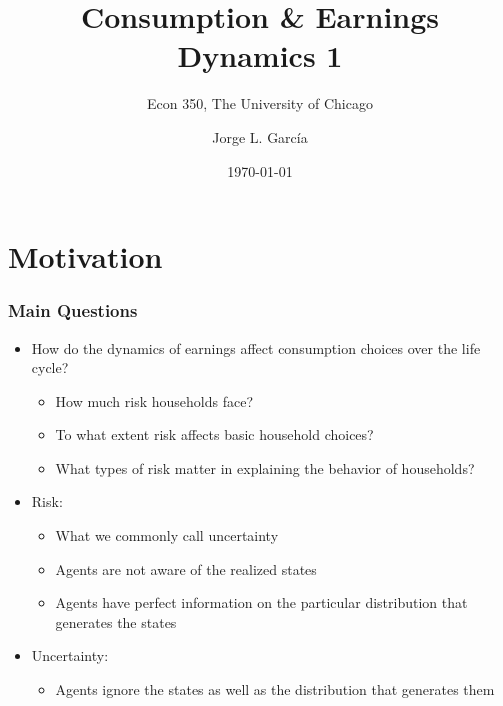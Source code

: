 

\title{Consumption \& Earnings Dynamics 1}
\subtitle{Econ 350, The University of Chicago}
\author{Jorge L. Garc\'{i}a}
\date{\today}






\begin{frame}[plain]
	\titlepage
\end{frame}



\section{Motivation}

\begin{frame}
	\frametitle{Main Questions}
\begin{itemize}
	\item How do the dynamics of earnings affect consumption choices over the life cycle?
		\begin{itemize}
			\item How much risk households face?
			\item To what extent risk affects basic household choices?
			\item What types of risk matter in explaining the behavior of households?		
		\end{itemize}
	\item Risk:
			\begin{itemize}
				\item What we commonly call uncertainty
				\item Agents are not aware of the realized states
				\item Agents have perfect information on the particular distribution that generates the states
			\end{itemize}
	\item Uncertainty:
			\begin{itemize}
				\item Agents ignore the states as well as the distribution that generates them
			\end{itemize}
\end{itemize}
\end{frame}

